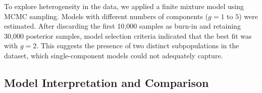 \documentclass[10.5pt]{article} %
\begin{document}
\vspace{1em}

\noindent
To explore heterogeneity in the data, we applied a finite mixture model using MCMC sampling. Models with different numbers of components (\(g = 1\) to \(5\)) were estimated. After discarding the first 10,000 samples as burn-in and retaining 30,000 posterior samples, model selection criteria indicated that the best fit was with \(g = 2\). This suggests the presence of two distinct subpopulations in the dataset, which single-component models could not adequately capture.

\subsection{Model Interpretation and Comparison}
\end{document}

